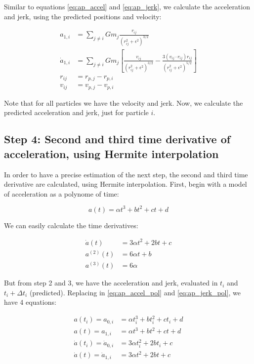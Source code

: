 \begin{appendixs}
	Similar to equations \ref{eq:ap_accel} and \ref{eq:ap_jerk}, we calculate the acceleration and jerk, using the predicted positions and velocity:
	
	\begin{align}
		a_{1, i} &= \sum_{j \neq i} G m_j \frac{r_{ij}}{(r_{ij}^2 + \epsilon^2)^{3/2}} \label{eq:ap_accel_pred} \\
		\dot{a}_{1, i} &= \sum_{j \neq i} G m_j \left[\frac{v_{ij}}{(r_{ij}^2 + \epsilon^2)^{3/2}} - \frac{3(v_{ij} \cdot r_{ij})r_{ij}}{(r_{ij}^2 + \epsilon^2)^{5/2}}\right] \label{eq:ap_jerk_pred} \\
		r_{ij} &= r_{p,j} - r_{p,i} \\
		v_{ij} &= v_{p,j} - v_{p,i}
	\end{align}
	
	Note that for all particles we have the velocity and jerk. Now, we calculate the predicted acceleration and jerk, just for particle $i$.
	
	\subsection{Step 4: Second and third time derivative of acceleration, using Hermite interpolation}
	
	In order to have a precise estimation of the next step, the second and third time derivative are calculated, using Hermite interpolation. First, begin with a model of acceleration as a polynome of time:
	
	\begin{equation}
		a(t) = \alpha t^3 + b t^2 + c t + d \label{eq:ap_accel_pol}
	\end{equation}
	
	We can easily calculate the time derivatives:
	
	\begin{align}
		\dot{a}(t) &= 3 \alpha t^2 + 2 b t + c \label{eq:ap_jerk_pol} \\
		a^{(2)} (t) &= 6 \alpha t + b \label{eq:ap_a2_pol} \\
		a^{(3)} (t) &= 6 \alpha \label{eq:ap_a3_pol}
	\end{align}
	
	But from step 2 and 3, we have the acceleration and jerk, evaluated in $t_i$ and $t_i + \Delta t_i$ (predicted). Replacing in \ref{eq:ap_accel_pol} and \ref{eq:ap_jerk_pol}, we have 4 equations:
	
	\begin{align}
		a(t_i) = a_{0, i} &=  \alpha t_i^3 + b t_i^2 + c t_i + d \label{eq:ap_a_ti} \\
		a(t) = a_{1, i} &=  \alpha t^3 + b t^2 + c t + d \label{eq:ap_a_t} \\
		\dot{a}(t_i) = \dot{a}_{0, i} &= 3 \alpha t_i^2 + 2 b t_i + c \\
		\dot{a}(t) = \dot{a}_{1, i} &= 3 \alpha t^2 + 2 b t + c \label{eq:ap_adot_t}
	\end{align}
	

\end{appendixs}
